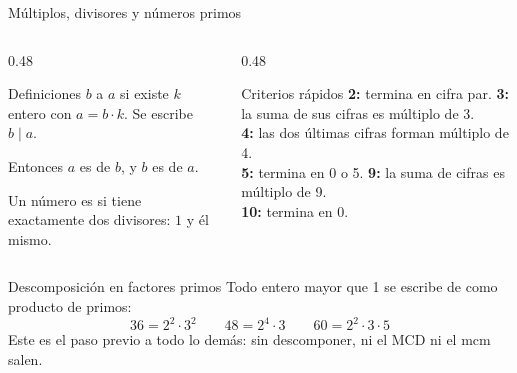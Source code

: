 \documentclass[aspectratio=169,10pt]{beamer}
\begin{document}
\begin{frame}{Múltiplos, divisores y números primos}
  \scriptsize
  \begin{columns}[T,onlytextwidth]
    \begin{column}{0.48\textwidth}
      \begin{block}{Definiciones}
        \tiny
        $b$  a $a$ si existe $k$ entero con $a = b\cdot k$.
        Se escribe $b \mid a$.

        \vspace{0.08cm}
        Entonces $a$ es  de $b$, y $b$ es  de $a$.

        \vspace{0.08cm}
        Un número es  si tiene exactamente dos divisores: $1$ y
        él mismo. 
      \end{block}
    \end{column}
    \begin{column}{0.48\textwidth}
      \begin{alertblock}{Criterios rápidos}
        \tiny
        \textbf{2:} termina en cifra par. \quad
        \textbf{3:} la suma de sus cifras es múltiplo de 3. \\
        \textbf{4:} las dos últimas cifras forman múltiplo de 4. \\
        \textbf{5:} termina en 0 o 5. \quad
        \textbf{9:} la suma de cifras es múltiplo de 9. \\
        \textbf{10:} termina en 0.
      \end{alertblock}
    \end{column}
  \end{columns}

  \vspace{0.1cm}
  \begin{exampleblock}{Descomposición en factores primos}
    \scriptsize
    Todo entero mayor que 1 se escribe de  como
    producto de primos:
    \[ 36 = 2^2\cdot 3^2 \qquad 48 = 2^4\cdot 3 \qquad
       60 = 2^2\cdot 3\cdot 5 \]
    Este es el paso previo a todo lo demás: sin descomponer, ni el MCD ni el
    mcm salen.
  \end{exampleblock}
\end{frame}
\end{document}
